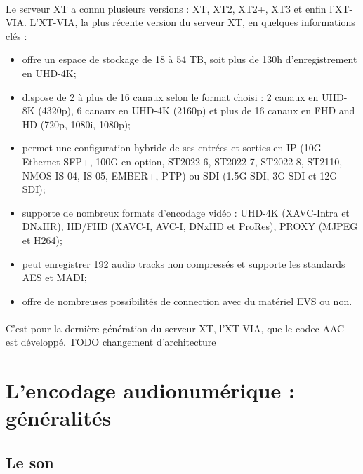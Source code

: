 \documentclass{article}
\begin{document}
    \paragraph{}
    Le serveur XT a connu plusieurs versions : XT, XT2, XT2+, XT3 et enfin l'XT-VIA. L'XT-VIA, la plus récente version du serveur XT, en quelques informations clés\cite{EVS:XT} :
    \begin{itemize}
        \item offre un espace de stockage de 18 à 54 TB, soit plus de 130h d'enregistrement en UHD-4K;
        \item dispose de 2 à plus de 16 canaux selon le format choisi : 2 canaux en UHD-8K (4320p), 6 canaux en UHD-4K (2160p) et plus de 16 canaux en FHD and HD (720p, 1080i, 1080p);
        \item permet une configuration hybride de ses entrées et sorties en IP (10G Ethernet SFP+, 100G en option, ST2022-6, ST2022-7, ST2022-8, ST2110, NMOS IS-04, IS-05, EMBER+, PTP) ou SDI (1.5G-SDI, 3G-SDI et 12G-SDI);
        \item supporte de nombreux formats d'encodage vidéo : UHD-4K (XAVC-Intra et DNxHR), HD/FHD (XAVC-I, AVC-I, DNxHD et ProRes), PROXY (MJPEG et H264);
        \item peut enregistrer 192 audio tracks non compressés et supporte les standards AES et MADI;
        \item offre de nombreuses possibilités de connection avec du matériel EVS ou non.
    \end{itemize}

    \paragraph{}
    C'est pour la dernière génération du serveur XT, l'XT-VIA, que le codec AAC est développé. TODO changement d'architecture

    \section{L'encodage audionumérique : généralités}
    \subsection{Le son}


\end{document}
